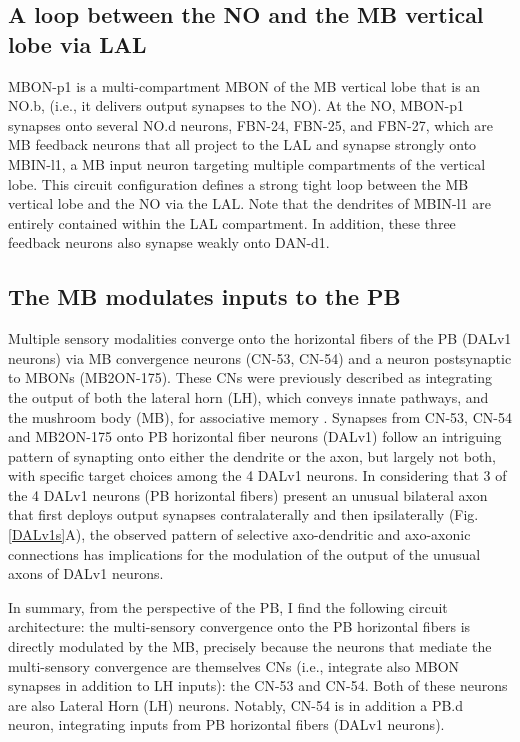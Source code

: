     \subsection{A loop between the NO and the MB vertical lobe via LAL}
    MBON-p1 is a multi-compartment MBON of the MB vertical lobe that is an NO.b, (i.e., it delivers output synapses to the NO).
    At the NO, MBON-p1 synapses onto several NO.d neurons, FBN-24, FBN-25, and FBN-27, which are MB feedback neurons \citep{eschbach2020recurrent} that all project to the LAL and synapse strongly onto MBIN-l1, a MB input neuron targeting multiple compartments of the vertical lobe.
    This circuit configuration defines a strong tight loop between the MB vertical lobe and the NO via the LAL.  Note that the dendrites of MBIN-l1 are entirely contained within the LAL compartment.
    In addition, these three feedback neurons also synapse weakly onto DAN-d1.

    \subsection{The MB modulates inputs to the PB}
    Multiple sensory modalities converge onto the horizontal fibers of the PB (DALv1 neurons) via MB convergence neurons (CN-53, CN-54) and a neuron postsynaptic to MBONs (MB2ON-175).
    These CNs were previously described as integrating the output of both the lateral horn (LH), which conveys innate pathways, and the mushroom body (MB), for associative memory \citep{eschbach2021circuits}.
    Synapses from CN-53, CN-54 and MB2ON-175 onto PB horizontal fiber neurons (DALv1) follow an intriguing pattern of synapting onto either the dendrite or the axon, but largely not both, with specific target choices among the 4 DALv1 neurons.
    In considering that 3 of the 4 DALv1 neurons (PB horizontal fibers) present an unusual bilateral axon that first deploys output synapses contralaterally and then ipsilaterally (Fig. \ref{DALv1s}A), the observed pattern of selective axo-dendritic and axo-axonic connections has implications for the modulation of the output of the unusual axons of DALv1 neurons.

    In summary, from the perspective of the PB, I find the following circuit architecture: the multi-sensory convergence onto the PB horizontal fibers is directly modulated by the MB, precisely because the neurons that mediate the multi-sensory convergence are themselves CNs (i.e., integrate also MBON synapses in addition to LH inputs): the CN-53 and CN-54. Both of these neurons are also Lateral Horn (LH) neurons.  Notably, CN-54 is in addition a PB.d neuron, integrating inputs from PB horizontal fibers (DALv1 neurons).

